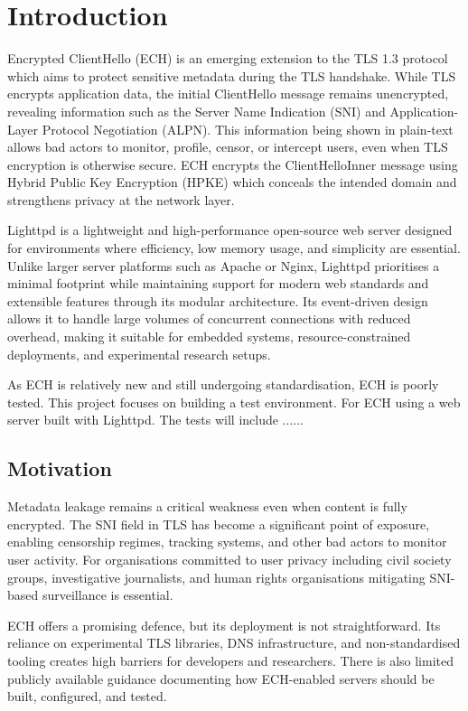 \chapter{Introduction}

Encrypted ClientHello (ECH) is an emerging extension to the TLS 1.3 protocol which aims to protect sensitive metadata during the TLS handshake. While TLS encrypts application data, the initial ClientHello message remains unencrypted, revealing information such as the Server Name Indication (SNI) and Application-Layer Protocol Negotiation (ALPN). This information being shown in plain-text allows bad actors to monitor, profile, censor, or intercept users, even when TLS encryption is otherwise secure. ECH encrypts the ClientHelloInner message using Hybrid Public Key Encryption (HPKE) which conceals the intended domain and strengthens privacy at the network layer.

Lighttpd is a lightweight and high-performance open-source web server designed for environments where efficiency, low memory usage, and simplicity are essential. Unlike larger server platforms such as Apache or Nginx, Lighttpd prioritises a minimal footprint while maintaining support for modern web standards and extensible features through its modular architecture. Its event-driven design allows it to handle large volumes of concurrent connections with reduced overhead, making it suitable for embedded systems, resource-constrained deployments, and experimental research setups.

As ECH is relatively new and still undergoing standardisation, ECH is poorly tested. This project focuses on building a test environment. For ECH using a web server built with Lighttpd. The tests will include ......

\section{Motivation}

Metadata leakage remains a critical weakness even when content is fully encrypted. The SNI field in TLS has become a significant point of exposure, enabling censorship regimes, tracking systems, and other bad actors to monitor user activity. For organisations committed to user privacy including civil society groups, investigative journalists, and human rights organisations mitigating SNI-based surveillance is essential.

ECH offers a promising defence, but its deployment is not straightforward. Its reliance on experimental TLS libraries, DNS infrastructure, and non-standardised tooling creates high barriers for developers and researchers. There is also limited publicly available guidance documenting how ECH-enabled servers should be built, configured, and tested.

